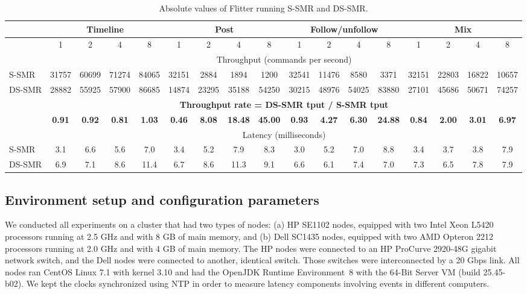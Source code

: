 \begin{table}[htdp]
\vspace{10mm}
\caption{Absolute values of Flitter running S-SMR and DS-SMR.}
\centering
\begin{tabular}{|l|c|c|c|c|c|c|c|c|c|c|c|c|c|c|c|c|} \hline
& \multicolumn{4}{|c|}{Timeline}	 &  \multicolumn{4}{|c|}{Post} &  \multicolumn{4}{|c|}{Follow/unfollow} &  \multicolumn{4}{|c|}{Mix} \\ \hline
		& 1	      & 2	   & 4		 & 8	       & 1	     & 2	 & 4		 & 8	     & 1	  & 2		 & 4	        & 8	     & 1	   & 2		& 4	       & 8	 \\ \hline\hline
		& \multicolumn{16}{|c|}{Throughput (commands per second)} \\ \hline
S-SMR  	& 31757 & 60699 & 71274 & 84065 & 32151 & 2884  & 1894	 & 1200   & 32541 & 11476 & 8580    & 3371   & 32151 & 22803 & 16822 & 10657 \\ \hline
DS-SMR	& 28882 & 55925 & 57900 & 86685 & 14874 & 23295 & 35188	 & 54250 & 30215 & 48976 & 54025	& 83880 & 27101 & 45686 & 50671 & 74257 \\ \hline\hline
		& \multicolumn{16}{|c|}{\textbf{Throughput rate = DS-SMR tput / S-SMR tput}} \\ \hline
		& \textbf{0.91} & \textbf{0.92}	& \textbf{0.81} & \textbf{1.03}  		& \textbf{0.46}  & \textbf{8.08}	  & \textbf{18.48}	 & \textbf{45.00}  & \textbf{0.93}    & \textbf{4.27}	  & \textbf{6.30}	& \textbf{24.88}  & \textbf{0.84}	    & \textbf{2.00}	& \textbf{3.01}	& \textbf{6.97}	 \\ \hline\hline
		& \multicolumn{16}{|c|}{Latency (milliseconds)} \\ \hline
S-SMR	& 3.1 & 6.6 & 5.6 & 7.0  & 3.4	& 5.2		& 7.9		& 8.3		& 3.0		& 5.2		& 7.0		& 8.8		& 3.4		& 3.7		& 3.8		& 7.9	 \\ \hline
DS-SMR	& 6.9 & 7.1 & 8.6 & 11.4 & 6.7	& 8.6		& 11.3	& 9.1		& 6.6		& 6.1		& 7.4		& 7.0		& 7.3		& 6.5		& 7.8		& 7.9	 \\ \hline
\end{tabular}
\label{default}
\vspace{10mm}
\end{table}%

\subsection{Environment setup and configuration parameters}
\label{sec:evaluation:setup}

We conducted all experiments on a cluster that had two types of nodes: (a) HP SE1102 nodes, equipped with two Intel Xeon L5420 processors running at 2.5 GHz and with 8 GB of main memory, and (b) Dell SC1435 nodes, equipped with two AMD Opteron 2212 processors running at 2.0 GHz and with 4 GB of main memory. The HP nodes were connected to an HP ProCurve 2920-48G gigabit network switch, and the Dell nodes were connected to another, identical switch. Those switches were interconnected by a 20 Gbps link.
All nodes ran CentOS Linux 7.1 with kernel 3.10 and had the OpenJDK Runtime Environment~8 with the \mbox{64-Bit} Server VM (build 25.45-b02).
We kept the clocks synchronized using NTP in order to measure latency components involving events in different computers.

